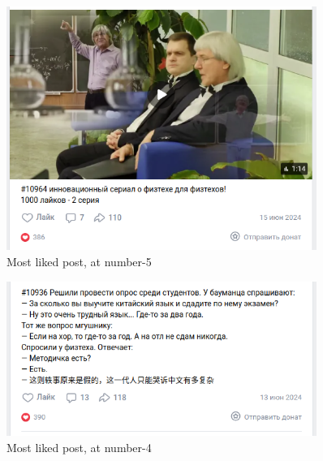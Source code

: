 \documentclass[
	12pt
] {article}
\begin{document}
	\newpage	
	\vspace*{\fill}
	\begin{figure}[H]
		\centering
		\includegraphics[width=0.9\textwidth]{fig-top-posts-5}
		\caption{Most liked post, at number-5}
		\label{fig-top-posts-5}
	\end{figure}
	\vfill
	
	\newpage	
	\vspace*{\fill}
	\begin{figure}[H]
		\centering
		\includegraphics[width=0.9\textwidth]{fig-top-posts-4}
		\caption{Most liked post, at number-4}
		\label{fig-top-posts-4}
	\end{figure}
	\vfill
	
\end{document}
